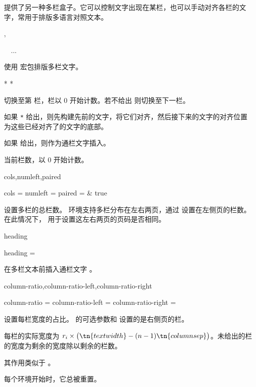 \documentclass[twoside]{book}
\begin{document}
 提供了另一种多栏盒子。它可以控制文字出现在某栏，也可以手动对齐各栏的文字，常用于排版多语言对照文本。

\begin{function}{\startparacol,\stopparacol}
  \begin{syntax}
    \V\startparacol {}
    ~~...
    \V\stopparacol 
  \end{syntax}
使用  宏包排版多栏文字。
\end{function}

\begin{function}[module=paracol]{\switchcolumn}
  \begin{syntax}
    \V\switchcolumn 
    \V\switchcolumn *
    \V\switchcolumn {}
    \V\switchcolumn {} * 
    \V\switchcolumn {} * 
  \end{syntax}
切换至第  栏，栏以 0 开始计数。若不给出  则切换至下一栏。

如果 \texttt{*} 给出，则先构建先前的文字，将它们对齐，然后接下来的文字的对齐位置为这些已经对齐了的文字的底部。

如果  给出，则作为通栏文字插入。
\end{function}

\begin{function}[module=paracol]{\thecolumn}
当前栏数，以 0 开始计数。
\end{function}

\begin{keyval}[path=paracol]{cols,numleft,paired}
  \begin{syntax}
    cols    = 
    numleft = 
    paired  = \TTF & true 
  \end{syntax}
 设置多栏的总栏数。 环境支持多栏分布在左右两页，通过  设置在左侧页的栏数。在此情况下， 用于设置这左右两页的页码是否相同。
\end{keyval}

\begin{keyval}[path=paracol]{heading}
  \begin{syntax}
    heading = 
  \end{syntax}
在多栏文本前插入通栏文字 。
\end{keyval}

\begin{keyval}[path=paracol]{column-ratio,column-ratio-left,column-ratio-right}
  \begin{syntax}
    column-ratio       =  
    column-ratio-left  = 
    column-ratio-right = 
  \end{syntax}
设置每栏宽度的占比。 的可选参数和  设置的是右侧页的栏。

每栏的实际宽度为 $r_i\times\bigl(\tn{textwidth}-(n-1)\tn{columnsep}\bigr)$。未给出的栏的宽度为剩余的宽度除以剩余的栏数。

其作用类似于 。

每个环境开始时，它总被重置。
\end{keyval}
\end{document}
